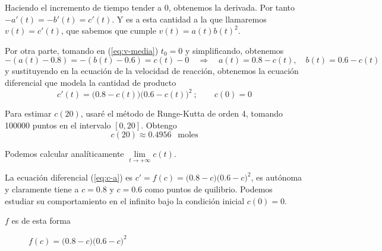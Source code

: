\documentclass[a4]{article}
\begin{document}
Haciendo el incremento de tiempo tender a 0, obtenemos la
derivada. Por tanto $-a'(t)=-b'(t)=c'(t)$. Y es a esta cantidad a la
que llamaremos $v(t)=c'(t)$, que sabemos que cumple $v(t)=a(t)b(t)^2$.

Por otra parte, tomando en (\ref{eq:v-media}) $t_0=0$ y simplificando,
obtenemos
\begin{equation} \label{eq:acbc}
  -(a(t)-0.8)=-(b(t)-0.6)=c(t)-0\quad \Longrightarrow\quad
  a(t)=0.8-c(t),\quad b(t)=0.6-c(t)
\end{equation}
y sustituyendo en la ecuación de la velocidad de reacción, obtenemos
la ecuación diferencial que modela la cantidad de producto
\begin{equation}
  \label{eq:c-a}
  c'(t)=\big(0.8-c(t)\big)\big(0.6-c(t)\big)^2\ ;\qquad c(0)=0
\end{equation}

Para estimar $c(20)$, usaré el método de Runge-Kutta de orden 4,
tomando 100000 puntos en el intervalo $[0,20]$. Obtengo
\[c(20)\approx 0.4956\ \ \text{ moles}\]

Podemos calcular analíticamente $\lim\limits_{t\to +\infty}c(t)$.

La ecuación diferencial (\ref{eq:c-a}) es
$c'=f(c)=\big(0.8-c\big)\big(0.6-c\big)^2$, es autónoma y claramente
tiene a $c=0.8$ y $c=0.6$ como puntos de quilibrio. Podemos estudiar
su comportamiento en el infinito bajo la condición inicial $c(0)=0$.

$f$ es de esta forma
\begin{figure}[H]
  \centering
  \caption{$f(c)=\big(0.8-c\big)\big(0.6-c\big)^2$}
  \label{fig:f}
\end{figure}
\end{document}
